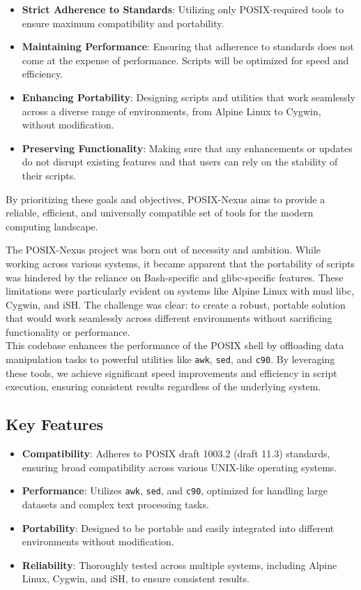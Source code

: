 \begin{itemize} 
    \item \textbf{Strict Adherence to Standards}: Utilizing only POSIX-required tools to ensure maximum compatibility and portability. 
    \item \textbf{Maintaining Performance}: Ensuring that adherence to standards does not come at the expense of performance. Scripts will be optimized for speed and efficiency. 
    \item \textbf{Enhancing Portability}: Designing scripts and utilities that work seamlessly across a diverse range of environments, from Alpine Linux to Cygwin, without modification. 
    \item \textbf{Preserving Functionality}: Making sure that any enhancements or updates do not disrupt existing features and that users can rely on the stability of their scripts. 
\end{itemize}

By prioritizing these goals and objectives, POSIX-Nexus aims to provide a reliable, efficient, and universally compatible set of tools for the modern computing landscape.





The POSIX-Nexus project was born out of necessity and ambition. While working across various systems, it became apparent that the portability of scripts was hindered by the reliance on Bash-specific and glibc-specific features. These limitations were particularly evident on systems like Alpine Linux with musl libc, Cygwin, and iSH. The challenge was clear: to create a robust, portable solution that would work seamlessly across different environments without sacrificing functionality or performance.
\\

This codebase enhances the performance of the POSIX shell by offloading data manipulation tasks to powerful utilities like \texttt{awk}, \texttt{sed}, and \texttt{c90}. By leveraging these tools, we achieve significant speed improvements and efficiency in script execution, ensuring consistent results regardless of the underlying system.

\subsection{Key Features}
\begin{itemize}
    \item \textbf{Compatibility}: Adheres to POSIX draft 1003.2 (draft 11.3) standards, ensuring broad compatibility across various UNIX-like operating systems.
    \item \textbf{Performance}: Utilizes \texttt{awk}, \texttt{sed}, and \texttt{c90}, optimized for handling large datasets and complex text processing tasks.
    \item \textbf{Portability}: Designed to be portable and easily integrated into different environments without modification.
    \item \textbf{Reliability}: Thoroughly tested across multiple systems, including Alpine Linux, Cygwin, and iSH, to ensure consistent results.
\end{itemize}

